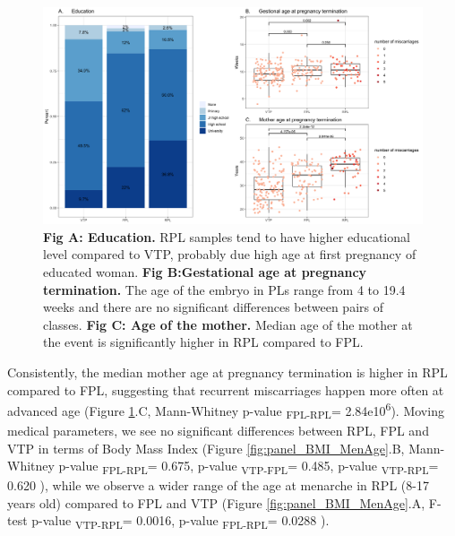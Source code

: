 \begin{figure}[H]
\centering
\includegraphics[width=1.10\textwidth]{fig/panel_edu_gestAge_mothAge.png}
\decoRule
\caption{\textbf{Fig A: Education.} RPL samples tend to have higher educational level compared to VTP, probably due high age at first pregnancy of educated woman. \textbf{Fig B:Gestational age at pregnancy termination.} The age of the embryo in PLs range from 4 to 19.4 weeks and there are no significant differences between pairs of classes. \textbf{Fig C: Age of the mother.} Median age of the mother at the event is significantly higher
in RPL compared to FPL.}
\label{fig:panel_edu_gestAge_mothAge}
\end{figure}



Consistently, the median mother age at pregnancy termination is higher in RPL compared to FPL, suggesting that recurrent miscarriages happen more often at advanced age (Figure \ref{fig:panel_edu_gestAge_mothAge}.C, Mann-Whitney p-value\textsubscript{ FPL-RPL}= 2.84e10\textsuperscript{6}). Moving medical parameters, we see no significant differences between RPL, FPL and VTP in terms of Body Mass Index (Figure \ref{fig:panel_BMI_MenAge}.B, Mann-Whitney p-value\textsubscript{ FPL-RPL}= 0.675, p-value\textsubscript{ VTP-FPL}= 0.485, p-value\textsubscript{ VTP-RPL}= 0.620 ), while we observe a wider range of the age at menarche in RPL (8-17 years old) compared to FPL and VTP (Figure \ref{fig:panel_BMI_MenAge}.A, F-test p-value\textsubscript{ VTP-RPL}= 0.0016, p-value\textsubscript{ FPL-RPL}= 0.0288 ).  \newline



